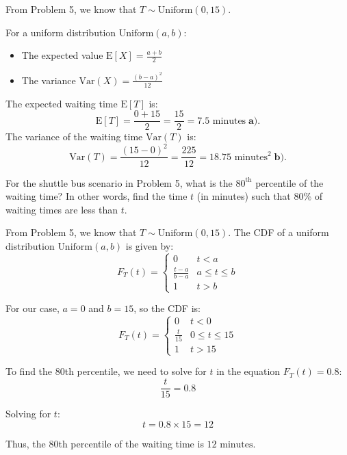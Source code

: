 \documentclass[a4paper, 10pt]{article}
\begin{document}
\begin{solution}
	From Problem 5, we know that \( T \sim \text{Uniform}(0, 15) \).

	\myspace

	For a uniform distribution \( \text{Uniform}(a, b) \):
	\begin{itemize}
		\item The expected value \( \text{E}[X] = \frac{a + b}{2} \)
		\item The variance \( \text{Var}(X) = \frac{(b - a)^2}{12} \)
	\end{itemize}

	The expected waiting time \( \text{E}[T] \) is:
	\[ \text{E}[T] = \frac{0 + 15}{2} = \frac{15}{2} = \boxed{7.5 \text{ minutes}} \; \textbf{a).} \]
	The variance of the waiting time \( \text{Var}(T) \) is:
	\[ \text{Var}(T) = \frac{(15 - 0)^2}{12} = \frac{225}{12} = \boxed{18.75 \text{ minutes}^2}  \; \textbf{b).} \]
\end{solution}

\begin{problem}
For the shuttle bus scenario in Problem 5, what is the \( 80^\text{th} \) percentile of the waiting time?
In other words, find the time \( t \) (in minutes) such that 80\% of waiting times are less than \( t \).
\end{problem}

\begin{tosubmit}
	From Problem 5, we know that \( T \sim \text{Uniform}(0, 15) \). \newline
	The CDF of a uniform distribution \( \text{Uniform}(a, b) \) is given by:
	\[
		F_T(t) = \begin{cases}
			0                   & t < a           \\
			\frac{t - a}{b - a} & a \leq t \leq b \\
			1                   & t > b
		\end{cases}
	\]

	For our case, \( a = 0 \) and \( b = 15 \), so the CDF is:
	\[
		F_T(t) = \begin{cases}
			0            & t < 0            \\
			\frac{t}{15} & 0 \leq t \leq 15 \\
			1            & t > 15
		\end{cases}
	\]

	To find the 80th percentile, we need to solve for \( t \) in the equation \( F_T(t) = 0.8 \):
	\[\frac{t}{15} = 0.8 \]

	Solving for \( t \):
	\[ t = 0.8 \times 15 = 12 \]

	Thus, the 80th percentile of the waiting time is \( \boxed{12 \text{ minutes}} \).
\end{tosubmit}
\end{document}
